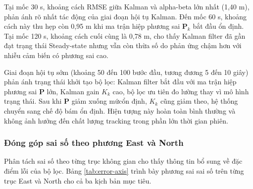 Tại mốc 30 s, khoảng cách RMSE giữa Kalman và alpha-beta lớn nhất (1,40 m), phản ánh rõ nhất tác động của giai đoạn hội tụ Kalman. Đến mốc 60 s, khoảng cách này thu hẹp còn 0,95 m khi ma trận hiệp phương sai $\mathbf{P}_k$ bắt đầu ổn định. Tại mốc 120 s, khoảng cách cuối cùng là 0,78 m, cho thấy Kalman filter đã gần đạt trạng thái Steady-state nhưng vẫn còn thừa số do phản ứng chậm hơn với nhiễu cảm biến có phương sai cao.

Giai đoạn hội tụ sớm (khoảng 50 đến 100 bước đầu, tương đương 5 đến 10 giây) phản ánh trạng thái khởi tạo bộ lọc: Kalman filter bắt đầu với ma trận hiệp phương sai $\mathbf{P}$ lớn, Kalman gain $K_k$ cao, bộ lọc ưu tiên đo lường thay vì mô hình trạng thái. Sau khi $\mathbf{P}$ giảm xuống mứcổn định, $K_k$ cũng giảm theo, hệ thống chuyển sang chế độ bám ổn định. Hiện tượng này hoàn toàn bình thường và không ảnh hưởng đến chất lượng tracking trong phần lớn thời gian phiên.

\subsubsection{Đóng góp sai số theo phương East và North}

\hspace{0.5cm} Phân tách sai số theo từng trục không gian cho thấy thông tin bổ sung về đặc điểm lỗi của bộ lọc. Bảng \ref{tab:error-axis} trình bày phương sai sai số trên từng trục East và North cho cả ba kịch bản mục tiêu.

\begin{table}[H]
\centering
\caption{Phương sai sai số theo trục East và North (seed = 42, 120 s, 10 Hz)}
\label{tab:error-axis}
\end{table}

